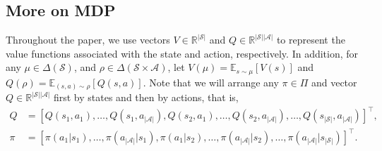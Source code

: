 \documentclass[10pt]{article}
\newcommand{\calA}{\mathcal{A}}
\newcommand{\calS}{\mathcal{S}}
\newcommand{\E}{\mathbb{E}}
\theoremstyle{plain}
\theoremstyle{definition}
\begin{document}
\subsection{More on MDP}
Throughout the paper, we use vectors $V \in \mathbb{R}^{|\calS|}$ and $Q \in \mathbb{R}^{|\calS||\calA|}$ to represent the value functions associated with the state and action, respectively. In addition, for any  $\mu\in\Delta(\calS)$, and $\rho\in\Delta(\calS\times\calA)$, let $V(\mu) = \E_{s\sim\mu}[V(s)]$ and $Q(\rho) = \E_{(s,a)\sim\rho}[Q(s,a)]$.
Note that  we will arrange any $\pi \in \Pi$ and vector $Q \in \mathbb{R}^{|\calS||\calA|}$ first by states and then  by actions, that is,
\begin{align*}
    Q &= [Q(s_1, a_1), \dots, Q(s_1, a_{|\calA|}), Q(s_2, a_1), \dots, Q(s_2, a_{|\calA|}), \dots, Q(s_{|\calS|}, a_{|\calA|})]^\top, \\
    \pi &= [\pi(a_1 | s_1), \dots, \pi(a_{|\calA|} | s_1), \pi(a_1 | s_2), \dots, \pi(a_{|\calA|} | s_2), \dots, \pi(a_{|\calA|} | s_{|\calS|})]^\top. 
\end{align*}
\end{document}

